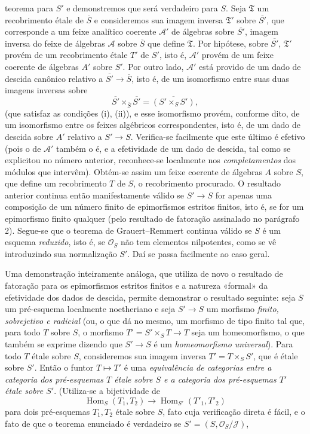 teorema para $S'$ e demonstremos que será verdadeiro para $S$. Seja
$\mathfrak T$ um recobrimento étale de $\overline S$ e consideremos sua imagem
inversa $\mathfrak T'$ sobre $\overline{S'}$, que corresponde a um feixe
analítico coerente $\mathcal A'$ de álgebras sobre $\overline{S'}$, imagem
inversa do feixe de álgebras $\mathcal A$ sobre $\overline S$ que define
$\mathfrak T$. Por hipótese, sobre $\overline{S'}$, $\mathfrak T'$ provém de
um recobrimento étale $T'$ de $S'$, isto é, $\mathcal A'$ provém de um feixe
coerente de álgebras $A'$ sobre $S'$. Por outro lado, $\mathcal A'$ está
provido de um dado de descida canônico relativo a
$\overline{S'}\longrightarrow\overline S$, isto é, de um isomorfismo entre
suas duas imagens inversas sobre
\[
  \overline{S'}\times_{\overline S}\overline{S'}
  =\overline{(S'\times_SS')},
\]
(que satisfaz as condições (i), (ii)), e esse isomorfismo provém, conforme
dito, de um isomorfismo entre os feixes algébricos correspondentes, isto é,
de um dado de descida sobre $A'$ relativo a
$S'\longrightarrow S$. Verifica-se facilmente que este último é efetivo
(pois o de $\mathcal A'$ também o é, e a efetividade de um dado de descida,
tal como se explicitou no número anterior, reconhece-se localmente nos
\emph{completamentos} dos módulos que intervêm). Obtém-se assim um feixe
coerente de álgebras $A$ sobre $S$, que define um recobrimento $T$ de $S$,
o recobrimento procurado. O resultado anterior continua então manifestamente
válido se $S'\longrightarrow S$ for apenas uma composição de um número finito
de epimorfismos estritos finitos, isto é, se for um epimorfismo finito
qualquer (pelo resultado de fatoração assinalado no parágrafo 2). Segue-se que
o teorema de Grauert--Remmert continua válido se $S$ é um esquema
\emph{reduzido}, isto é, se $\mathcal O_S$ não tem elementos nilpotentes, como
se vê introduzindo sua normalização $S'$. Daí se passa facilmente ao caso geral.

Uma demonstração inteiramente análoga, que utiliza de novo o resultado de
fatoração para os epimorfismos estritos finitos e a natureza «formal» da
efetividade dos dados de descida, permite demonstrar o resultado seguinte:
seja $S$ um pré-esquema localmente noetheriano e seja
$S'\longrightarrow S$ um morfismo \emph{finito, sobrejetivo e radicial} (ou,
o que dá no mesmo, um morfismo de tipo finito tal que, para todo $T$
sobre $S$, o morfismo $T'=S'\times_ST\longrightarrow T$ seja um homeomorfismo,
o que também se exprime dizendo que $S'\longrightarrow S$ é um
\emph{homeomorfismo universal}). Para todo $T$ étale sobre $S$, consideremos
sua imagem inversa $T'=T\times_SS'$, que é étale sobre $S'$. Então o
funtor $T\longmapsto T'$ é uma \emph{equivalência de categorias entre a
categoria dos pré-esquemas $T$ étale sobre $S$ e a categoria dos
pré-esquemas $T'$ étale sobre $S'$}. (Utiliza-se a bijetividade de
\[
  \operatorname{Hom}_S(T_1,T_2)\longrightarrow
  \operatorname{Hom}_{S'}(T'_1,T'_2)
\]
para dois pré-esquemas $T_1,T_2$ étale sobre $S$, fato cuja verificação direta
é fácil, e o fato de que o teorema enunciado é verdadeiro se
$S'=(S,\mathcal O_S/\mathcal J)$,

